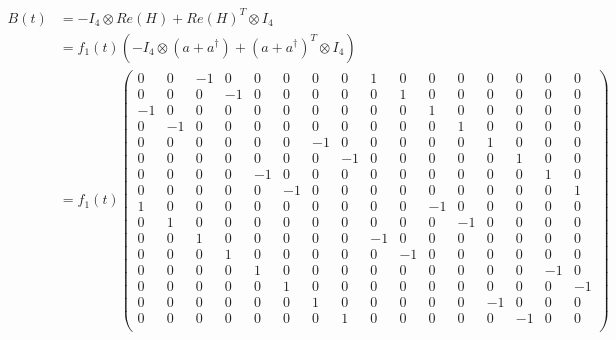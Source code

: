 \documentclass[12pt]{article}
\begin{document}
\begin{align*}
  B(t) &= - I_4 \otimes Re(H) + Re(H)^T \otimes I_4 \\
    &= f_1(t) \left( -I_4 \otimes (a+a^{\dagger}) + (a+a^{\dagger})^T\otimes I_4 \right)\\
    &= f_1(t) \left(
          \begin{array}{cccc|cccc|cccc|cccc}
            0 & 0 &-1 & 0  &  0 & 0 & 0 & 0  &    1 & 0 & 0 & 0 &  0 & 0 & 0 & 0\\
            0 & 0 & 0 &-1  &  0 & 0 & 0 & 0  &    0 & 1 & 0 & 0 &  0 & 0 & 0 & 0\\
            -1& 0 & 0 & 0  &  0 & 0 & 0 & 0  &    0 & 0 & 1 & 0 &  0 & 0 & 0 & 0\\
            0 & -1& 0 & 0  &  0 & 0 & 0 & 0  &    0 & 0 & 0 & 1 &  0 & 0 & 0 & 0\\
            \hline
            0 & 0 & 0 & 0  &  0 & 0 &-1 & 0  &    0 & 0 & 0 & 0 &  1 & 0 & 0 & 0\\
            0 & 0 & 0 & 0  &  0 & 0 & 0 &-1  &    0 & 0 & 0 & 0 &  0 & 1 & 0 & 0\\
            0 & 0 & 0 & 0  &  -1& 0 & 0 & 0  &    0 & 0 & 0 & 0 &  0 & 0 & 1 & 0\\
            0 & 0 & 0 & 0  &  0 &-1 & 0 & 0  &    0 & 0 & 0 & 0 &  0 & 0 & 0 & 1\\
            \hline
            1 & 0 & 0 & 0  &  0 & 0 & 0 & 0  &    0 & 0 & -1& 0 &  0 & 0 & 0 & 0\\
            0 & 1 & 0 & 0  &  0 & 0 & 0 & 0  &    0 & 0 & 0 & -1&  0 & 0 & 0 & 0\\
            0 & 0 & 1 & 0  &  0 & 0 & 0 & 0  &    -1& 0 & 0 & 0 &  0 & 0 & 0 & 0\\
            0 & 0 & 0 & 1  &  0 & 0 & 0 & 0  &    0 & -1& 0 & 0 &  0 & 0 & 0 & 0\\
            \hline
            0 & 0 & 0 & 0  &  1 & 0 & 0 & 0  &    0 & 0 & 0 & 0 &  0 & 0 & -1& 0\\
            0 & 0 & 0 & 0  &  0 & 1 & 0 & 0  &    0 & 0 & 0 & 0 &  0 & 0 & 0 &-1\\
            0 & 0 & 0 & 0  &  0 & 0 & 1 & 0  &    0 & 0 & 0 & 0 &  -1& 0 & 0 & 0\\
            0 & 0 & 0 & 0  &  0 & 0 & 0 & 1  &    0 & 0 & 0 & 0 &  0 & -1& 0 & 0\\
          \end{array}
    \right)
\end{align*}
\end{document}
